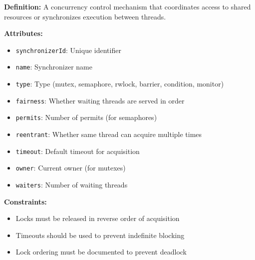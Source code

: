 \documentclass[11pt,letterpaper]{article}
\begin{document}
\begin{definitionbox}
\textbf{Definition:} A concurrency control mechanism that coordinates access to shared resources or synchronizes execution between threads.

\textbf{Attributes:}
\begin{itemize}[nosep]
    \item \texttt{synchronizerId}: Unique identifier
    \item \texttt{name}: Synchronizer name
    \item \texttt{type}: Type (mutex, semaphore, rwlock, barrier, condition, monitor)
    \item \texttt{fairness}: Whether waiting threads are served in order
    \item \texttt{permits}: Number of permits (for semaphores)
    \item \texttt{reentrant}: Whether same thread can acquire multiple times
    \item \texttt{timeout}: Default timeout for acquisition
    \item \texttt{owner}: Current owner (for mutexes)
    \item \texttt{waiters}: Number of waiting threads
\end{itemize}

\textbf{Constraints:}
\begin{itemize}[nosep]
    \item Locks must be released in reverse order of acquisition
    \item Timeouts should be used to prevent indefinite blocking
    \item Lock ordering must be documented to prevent deadlock
\end{itemize}
\end{definitionbox}
\end{document}
